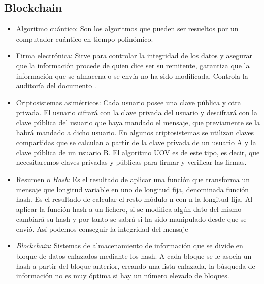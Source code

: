 \subsection{Blockchain}



\begin{itemize}
	\item Algoritmo cuántico: Son los algoritmos que pueden ser resueltos por un computador cuántico en tiempo polinómico.



 	\item Firma electrónica: Sirve para controlar la integridad de los datos y asegurar que la información procede de quien dice ser su remitente, garantiza que la información que se almacena o se envía no ha sido modificada. Controla la auditoría del documento \cite{firmaDigital}. 


	\item Criptosistemas asimétricos: Cada usuario posee una clave pública y otra privada. El usuario cifrará con la clave privada del usuario y descifrará con la clave pública del usuario que haya mandado el mensaje, que previamente se la habrá mandado a dicho usuario. En algunos criptosistemas se utilizan claves compartidas que se calculan a partir de la clave privada de un usuario A y la clave pública de un usuario B. El algoritmo UOV es de este tipo, es decir, que necesitaremos claves privadas y públicas para firmar y verificar las firmas.


	\item Resumen o \textit{Hash}: Es el resultado de aplicar una función que transforma un mensaje que longitud variable en uno de longitud fija, denominada función hash. Es el resultado de calcular el resto módulo n con n la longitud fija. Al aplicar la función hash a un fichero, si se modifica algún dato del mismo cambiará su hash y por tanto se sabrá si ha sido manipulado desde que se envió. Así podemos conseguir la integridad del mensaje


	\item \textit{Blockchain}: Sistemas de almacenamiento de información que se divide en bloque de datos enlazados mediante los hash. A cada bloque se le asocia un hash a partir del bloque anterior, creando una lista enlazada, la búsqueda de información no es muy óptima si hay un número elevado de bloques. %
	

\end{itemize}
